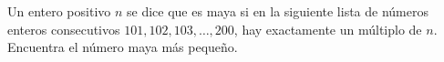 Un entero positivo $n$ se dice que es maya si en la siguiente lista de números enteros consecutivos $101, 102, 103, \dots , 200$, hay exactamente un múltiplo de $n$. Encuentra el número maya más pequeño.